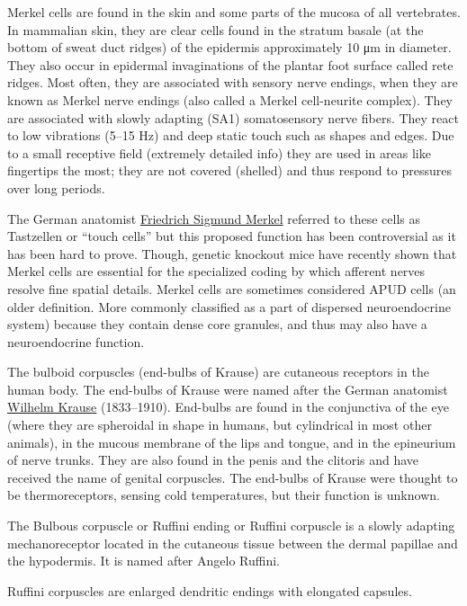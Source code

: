 Merkel cells are found in the skin and some parts of the mucosa of all vertebrates. In mammalian skin, they are clear cells found in the stratum basale (at the bottom of sweat duct ridges) of the epidermis approximately 10 μm in diameter. They also occur in epidermal invaginations of the plantar foot surface called rete ridges. Most often, they are associated with sensory nerve endings, when they are known as Merkel nerve endings (also called a Merkel cell-neurite complex). They are associated with slowly adapting (SA1) somatosensory nerve fibers. They react to low vibrations (5--15 Hz) and deep static touch such as shapes and edges. Due to a small receptive field (extremely detailed info) they are used in areas like fingertips the most; they are not covered (shelled) and thus respond to pressures over long periods.

The German anatomist \href{https://en.wikipedia.org/wiki/Friedrich_Sigmund_Merkel}{Friedrich Sigmund Merkel} referred to these cells as Tastzellen or ``touch cells'' but this proposed function has been controversial as it has been hard to prove. Though, genetic knockout mice have recently shown that Merkel cells are essential for the specialized coding by which afferent nerves resolve fine spatial details. Merkel cells are sometimes considered APUD cells (an older definition. More commonly classified as a part of dispersed neuroendocrine system) because they contain dense core granules, and thus may also have a neuroendocrine function.

The bulboid corpuscles (end-bulbs of Krause) are cutaneous receptors in the human body. The end-bulbs of Krause were named after the German anatomist \href{https://en.wikipedia.org/wiki/Wilhelm_Krause}{Wilhelm Krause} (1833--1910). End-bulbs are found in the conjunctiva of the eye (where they are spheroidal in shape in humans, but cylindrical in most other animals), in the mucous membrane of the lips and tongue, and in the epineurium of nerve trunks. They are also found in the penis and the clitoris and have received the name of genital corpuscles. The end-bulbs of Krause were thought to be thermoreceptors, sensing cold temperatures, but their function is unknown.

The Bulbous corpuscle or Ruffini ending or Ruffini corpuscle is a slowly adapting mechanoreceptor located in the cutaneous tissue between the dermal papillae and the hypodermis. It is named after Angelo Ruffini.

Ruffini corpuscles are enlarged dendritic endings with elongated capsules.

